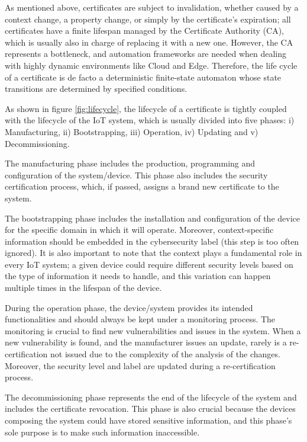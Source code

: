 As mentioned above, certificates are subject to invalidation, whether caused by a context change, a property change, or simply by the certificate's expiration; all certificates have a finite lifespan managed by the Certificate Authority (CA), which is usually also in charge of replacing it with a new one. However, the CA represents a bottleneck, and automation frameworks are needed when dealing with highly dynamic environments like Cloud and Edge. Therefore, the life cycle of a certificate is de facto a deterministic finite-state automaton whose state transitions are determined by specified conditions.

As shown in figure \ref{fig:lifecycle}, the lifecycle of a certificate is tightly coupled with the lifecycle of the IoT system, which is usually divided into five phases: i) Manufacturing, ii) Bootstrapping, iii) Operation, iv) Updating and v) Decommissioning.

The manufacturing phase includes the production, programming and configuration of the system/device. This phase also includes the security certification process, which, if passed, assigns a brand new certificate to the system.

The bootstrapping phase includes the installation and configuration of the device for the specific domain in which it will operate. Moreover, context-specific information should be embedded in the cybersecurity label (this step is too often ignored). It is also important to note that the context plays a fundamental role in every IoT system; a given device could require different security levels based on the type of information it needs to handle, and this variation can happen multiple times in the lifespan of the device.

During the operation phase, the device/system provides its intended functionalities and should always be kept under a monitoring process. The monitoring is crucial to find new vulnerabilities and issues in the system. When a new vulnerability is found, and the manufacturer issues an update, rarely is a re-certification not issued due to the complexity of the analysis of the changes. Moreover, the security level and label are updated during a re-certification process.

The decommissioning phase represents the end of the lifecycle of the system and includes the certificate revocation. This phase is also crucial because the devices composing the system could have stored sensitive information, and this phase's sole purpose is to make such information inaccessible.

